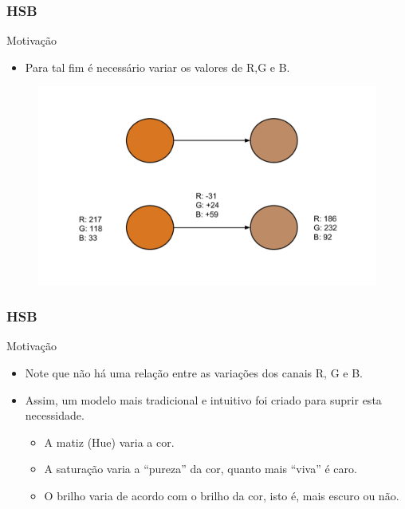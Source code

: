 \documentclass{beamer}
\begin{document}
		
\begin{frame}
\frametitle{HSB}
		\begin{block}{Motivação}
			\begin{itemize}
				\item Para tal fim é necessário variar os valores de R,G e B.
			\end{itemize}
		\end{block}
		
		\begin{figure}[!h]
			\begin{center}
				\includegraphics[width=1.0\textwidth]{Figures/WHYHSV}
			\end{center}
		\end{figure}			
\end{frame}

\begin{frame}
\frametitle{HSB}
		\begin{block}{Motivação}
			\begin{itemize}
				\item Note que não há uma relação entre as variações dos canais R, G e B.
			\end{itemize}
		\end{block}
		
		\begin{block}{}
			\begin{itemize}
				\item Assim, um modelo mais tradicional e intuitivo foi criado para suprir esta necessidade.
				\begin{itemize}
					\item A matiz (Hue) varia a cor.
					\item A saturação varia a ``pureza'' da cor, quanto mais ``viva'' é caro.
					\item O brilho varia de acordo com o brilho da cor, isto é, mais escuro ou não.
				\end{itemize}
			\end{itemize}
		\end{block}		
		
\end{frame}
\end{document}
